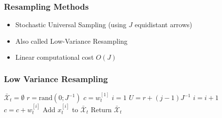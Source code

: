\begin{frame}
    \frametitle{Resampling Methods}

    \footnotesize

    \begin{overlayarea}{\textwidth}{\textheight}

        \begin{itemize}
            \item Stochastic Universal Sampling (using $J$ equidistant arrows)
            \item Also called Low-Variance Resampling
            \item Linear computational cost $O(J)$
        \end{itemize}
    \end{overlayarea}
\end{frame}


\begin{frame}
    \frametitle{Low Variance Resampling}
    \begin{algorithmic}[1]
        \State $\bar{\mathcal{X}}_t = \emptyset$
        \State $r = \text{rand}(0; J^{-1})$
        \State $c = w_t^{[1]}$
        \State $i = 1$
            \State $U = r + (j - 1) J^{-1}$
                \State $i = i + 1$
                \State $c = c + w_t^{[i]}$
            \EndWhile
            \State Add $x_t^{[i]}$ to $\bar{\mathcal{X}}_t$
        \EndFor
        \State Return $\bar{\mathcal{X}}_t$
        \EndProcedure
    \end{algorithmic}
\end{frame}

